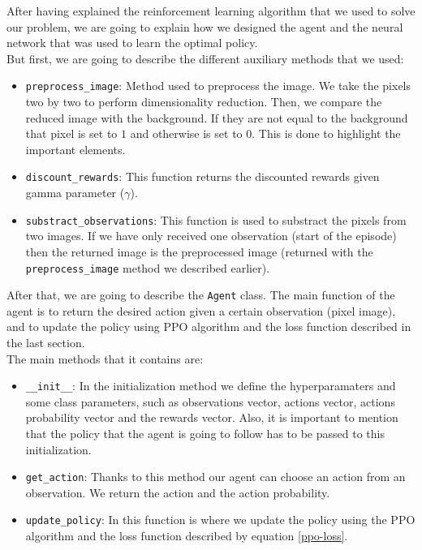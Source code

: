 \documentclass[12pt]{article}
\begin{document}
After having explained the reinforcement learning algorithm that we used to solve our problem, we are going to explain how we designed the agent and the neural network that was used to learn the optimal policy.\\

But first, we are going to describe the different auxiliary methods that we used:

\begin{itemize}
  \item \texttt{preprocess\_image}: Method used to preprocess the image. We take the pixels two by two to perform dimensionality reduction. Then, we compare the reduced image with the background. If they are not equal to the background that pixel is set to $1$ and otherwise is set to $0$. This is done to highlight the important elements.
  \item \texttt{discount\_rewards}: This function returns the discounted rewards given gamma parameter ($\gamma$).
  \item \texttt{substract\_observations}: This function is used to substract the pixels from two images. If we have only received one observation (start of the episode) then the returned image is the preprocessed image (returned with the \texttt{preprocess\_image} method we described earlier).
\end{itemize}

After that, we are going to describe the \texttt{Agent} class. The main function of the agent is to return the desired action given a certain observation (pixel image), and to update the policy using PPO algorithm and the loss function described in the last section. \\

The main methods that it contains are:

\begin{itemize}
    \item \texttt{\_\_init\_\_}: In the initialization method we define the hyperparamaters and some class parameters, such as observations vector, actions vector, actions probability vector and the rewards vector. Also, it is important to mention that the policy that the agent is going to follow has to be passed to this initialization.
    
    \item \texttt{get\_action}: Thanks to this method our agent can choose an action from an observation. We return the action and the action probability.
    
    \item \texttt{update\_policy}: In this function is where we update the policy using the PPO algorithm and the loss function described by equation \ref{ppo-loss}.
\end{itemize}
\end{document}
